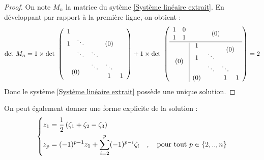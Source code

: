 \begin{proof}
On note $M_n$ la matrice du sytème \eqref{Système linéaire extrait}. En développant par rapport à la première ligne, on obtient :
\begin{gather*}
  \mbox{det }M_n =
  1 \times \mbox{det } \left(
  \begin{array}{ccccc}
    1 &                                         &        &        &   \\
    1 & \ddots                                  &        & (0)    &   \\
      & \ddots                                  & \ddots &        &   \\
    \multicolumn{2}{c}{\multirow{2}{*}{ (0) }}  & \ddots & \ddots &   \\
    \multicolumn{2}{c}{}                        &        & 1      & 1
  \end{array} \right)
  + 1 \times \mbox{det } \left(
  \begin{array}{cc|cccc}
    1 & 0                                       & \multicolumn{4}{c}{\multirow{2}{*}{ (0) }} \\
    1 & 1                                       & \multicolumn{4}{c}{}                       \\
    \hline
    \multicolumn{2}{c|}{\multirow{5}{*}{ (0) }} & 1   &        & \multicolumn{2}{c}{\multirow{2}{*}{ (0) }} \\
    \multicolumn{2}{c|}{}                       & 1   & \ddots & \multicolumn{2}{c}{}                       \\
    \multicolumn{2}{c|}{}                       &     & \ddots & \ddots &                                   \\
    \multicolumn{2}{c|}{}                       & (0) &        & 1      & 1
  \end{array} \right)
  = 2
\end{gather*}
Donc le système \eqref{Système linéaire extrait} possède une unique solution.
\end{proof}

On peut également donner une forme explicite de la solution :
\begin{equation}
  \left\{
  \begin{aligned}\notag
    z_1 &= \frac{1}{2}\left(\zeta_1 + \zeta_2 - \zeta_3\right) \\
    z_p &= (-1)^{p-1} z_1 + \sum_{i=2}^p (-1)^{p-i}\zeta_i \quad , \quad \mbox{pour tout } p \in \{2,..,n\}
  \end{aligned}
  \right.
\end{equation}

